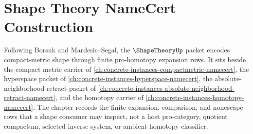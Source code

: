 \chapter{Shape Theory NameCert Construction}
\label{ch:concrete-instances-shape-theory-namecert}

Following Borsuk and Mardesic--Segal, the $\ShapeTheoryUp$ packet encodes compact-metric shape through finite pro-homotopy expansion rows. It sits beside the compact metric carrier of \autoref{ch:concrete-instances-compactmetric-namecert}, the hyperspace packet of \autoref{ch:concrete-instances-hyperspace-namecert}, the absolute-neighborhood-retract packet of \autoref{ch:concrete-instances-absolute-neighborhood-retract-namecert}, and the homotopy carrier of \autoref{ch:concrete-instances-homotopy-namecert}. The chapter records the finite expansion, comparison, and nonescape rows that a shape consumer may inspect, not a host pro-category, quotient compactum, selected inverse system, or ambient homotopy classifier.

